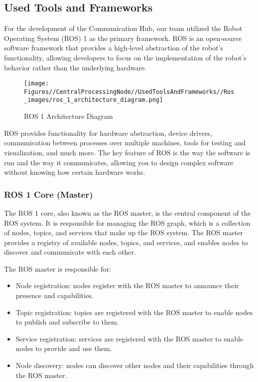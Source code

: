 \subsection{Used Tools and Frameworks}
\label{subsec:used_tools_frameworks}

For the development of the Communication Hub, our team utilized the Robot Operating System (ROS) 1 as the primary framework. ROS is an open-source software framework that provides a high-level abstraction of the robot's functionality, allowing developers to focus on the implementation of the robot's behavior rather than the underlying hardware.

\begin{figure}[h]
\centering
\texttt{[image: Figures//CentralProcessingNode//UsedToolsAndFrameworks//Ros\_images/ros\_1\_architecture\_diagram.png]}
\caption{ROS 1 Architecture Diagram}
\end{figure}

ROS provides functionality for hardware abstraction, device drivers, communication between processes over multiple machines, tools for testing and visualization, and much more. The key feature of ROS is the way the software is run and the way it communicates, allowing you to design complex software without knowing how certain hardware works.

\subsubsection{ROS 1 Core (Master)}

The ROS 1 core, also known as the ROS master, is the central component of the ROS system. It is responsible for managing the ROS graph, which is a collection of nodes, topics, and services that make up the ROS system. The ROS master provides a registry of available nodes, topics, and services, and enables nodes to discover and communicate with each other.

The ROS master is responsible for:

\begin{itemize}
\item Node registration: nodes register with the ROS master to announce their presence and capabilities.
\item Topic registration: topics are registered with the ROS master to enable nodes to publish and subscribe to them.
\item Service registration: services are registered with the ROS master to enable nodes to provide and use them.
\item Node discovery: nodes can discover other nodes and their capabilities through the ROS master.
\end{itemize}

